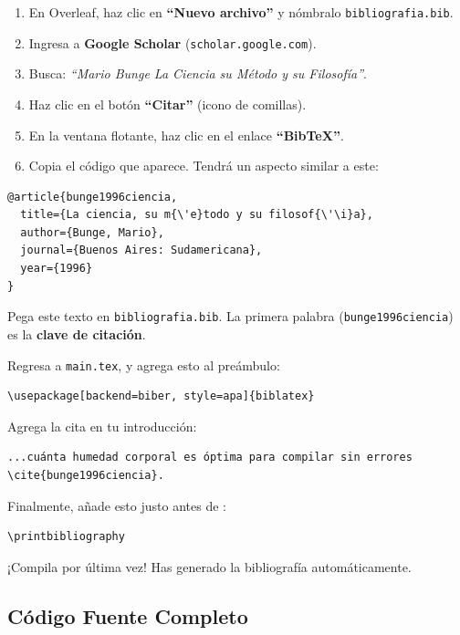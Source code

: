 \begin{enumerate}
	\item En Overleaf, haz clic en \textbf{“Nuevo archivo”} y nómbralo
	      \texttt{bibliografia.bib}.
	\item Ingresa a \textbf{Google Scholar} (\texttt{scholar.google.com}).
	\item Busca: \emph{“Mario Bunge La Ciencia su Método y su Filosofía”}.
	\item Haz clic en el botón \textbf{“Citar”} (icono de comillas).
	\item En la ventana flotante, haz clic en el enlace \textbf{“BibTeX”}.
	\item Copia el código que aparece. Tendrá un aspecto similar a este:
\end{enumerate}

\begin{verbatim}
@article{bunge1996ciencia,
  title={La ciencia, su m{\'e}todo y su filosof{\'\i}a},
  author={Bunge, Mario},
  journal={Buenos Aires: Sudamericana},
  year={1996}
}
\end{verbatim}

Pega este texto en \texttt{bibliografia.bib}. La primera palabra
(\texttt{bunge1996ciencia}) es la \textbf{clave de citación}.

Regresa a \texttt{main.tex}, y agrega esto al preámbulo:
\begin{verbatim}
\usepackage[backend=biber, style=apa]{biblatex}

\end{verbatim}

Agrega la cita en tu introducción:
\begin{verbatim}
...cuánta humedad corporal es óptima para compilar sin errores
\cite{bunge1996ciencia}.
\end{verbatim}

Finalmente, añade esto justo antes de \verb||:
\begin{verbatim}
\printbibliography
\end{verbatim}

¡Compila por última vez! Has generado la bibliografía automáticamente.

\subsection*{Código Fuente Completo}
\label{sub:codigo_completo}

